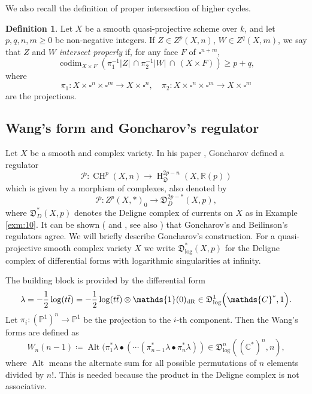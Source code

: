 \documentclass[11pt,a4paper]{amsart}
\newcommand{\dR}{\text{\rm dR}}
\newcommand{\C}{\mathds{C}}
\renewcommand{\P}{\mathds{P}}
\newcommand{\R}{\mathds{R}}
\newcommand{\caP}{\mathcal{P}}
\newcommand{\fD}{\mathfrak{D}}
\newcommand{\bfone}{{\mathds{1}}}
\DeclareMathOperator {\Alt} {Alt}
\DeclareMathOperator{\codim}{codim}
\DeclareMathOperator {\CH}{CH}
\DeclareMathOperator{\rH}{H}
\numberwithin{equation}{section}
\theoremstyle{plain}
\theoremstyle{definition}
\newtheorem{df}[prop]{Definition}
\begin{document}
We also recall the definition of proper intersection of higher cycles. 
\begin{df}\label{def:10}
Let $X$ be a smooth quasi-projective scheme over $k$, and let
  $p,q,n,m\ge 0$ be non-negative
integers. If  $Z\in Z^{p}(X,n)$, 
$W\in Z^{q}(X,m)$, we say that $Z$ and $W$
\emph{intersect properly} if, for any
face $F$ of $\square ^{n+m}$,
\begin{displaymath}
  \codim_{X\times F}\left( \pi_{1}^{-1}|Z| \, \cap \pi_{2}^{-1}|W|\,
    \cap \, (X\times
  F)\right)\ge p+q,
\end{displaymath}
where
\begin{displaymath}
  \pi_1\colon X\times \square ^{n}\times \square^{m}\to X\times
  \square ^{n},\quad 
  \pi_2\colon X\times \square ^{n}\times \square^{m}\to X\times
  \square ^{m}
\end{displaymath}
are the projections.
\end{df}
\subsection{Wang's form and Goncharov's regulator}\label{Gon-reg}
Let $X$ be a smooth and complex variety. In his paper \cite{Gon95}, Goncharov defined a regulator
\begin{displaymath}
  \caP\colon \CH^{p}(X,n)\longrightarrow \rH^{2p-n}_{\fD}(X,\R(p))
\end{displaymath}
which is given by a morphism of complexes, also denoted by 
\begin{displaymath}
  \caP\colon Z^{p}(X,\ast)_{0}\to
  \fD^{2p-\ast}_{D}(X,p),
\end{displaymath}
where $\fD^{\ast}_{D}(X,p)$ denotes the Deligne complex of currents on
$X$ as in Example \ref{exm:10}. It can be shown (\cite[\S
3.1.1]{Kerr:03} and \cite{KLM:06}, see also \cite[Theorem
7.8]{BFT}) that Goncharov's and Beilinson's regulators agree. We will
briefly describe Goncharov's construction. For a quasi-projective
smooth complex variety $X$ we write $\fD_{\log}^{\ast}(X,p)$ for the
Deligne complex of differential forms with logarithmic singularities
at infinity. 

The building block is
provided by the differential form
\begin{displaymath}
  \lambda=-\frac{1}{2}\log (t\bar
  t)=-\frac{1}{2}\log (t\bar
  t)\otimes \bfone(0)_{\dR}\in\fD^{1}_{\log}\Big(\C^{\ast},1\Big).
\end{displaymath}
Let
$\pi_{i}\colon (\P^1)^{n}\to \P^1$ be the projection to the $i$-th
component. Then the Wang's forms are defined as 
\begin{displaymath}
W_{n}(n-1)\coloneqq \Alt (\pi^{\ast}_{1}\lambda\bullet(\cdots
(\pi^{\ast}_{n-1}\lambda\bullet \pi^{\ast}_{n}\lambda))\in
\fD^{n}_{\log}((\C^\ast)^{n}, n),
\end{displaymath}
where $\Alt$ means the alternate sum for all possible permutations of
$n$ elements divided by $n!$. This is needed because the product in
the Deligne complex is not associative.
\end{document}
